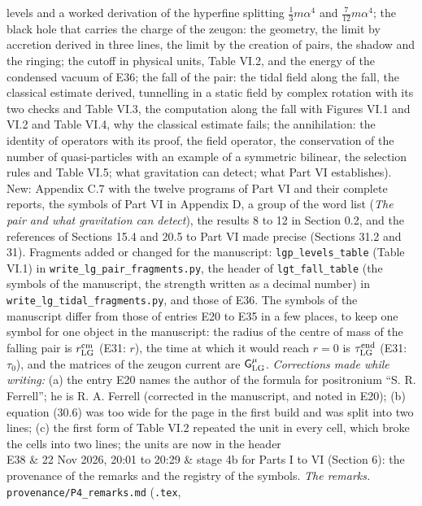 \documentclass[
  10pt,
]{article}
\begin{document}
\begin{longtable}[]
levels and a worked derivation of the hyperfine splitting
\(\tfrac13m\alpha^4\) and \(\tfrac7{12}m\alpha^4\); the black hole that
carries the charge of the zeugon: the geometry, the limit by accretion
derived in three lines, the limit by the creation of pairs, the shadow
and the ringing; the cutoff in physical units, Table VI.2, and the
energy of the condensed vacuum of E36; the fall of the pair: the tidal
field along the fall, the classical estimate derived, tunnelling in a
static field by complex rotation with its two checks and Table VI.3, the
computation along the fall with Figures VI.1 and VI.2 and Table VI.4,
why the classical estimate fails; the annihilation: the identity of
operators with its proof, the field operator, the conservation of the
number of quasi-particles with an example of a symmetric bilinear, the
selection rules and Table VI.5; what gravitation can detect; what Part
VI establishes). New: Appendix C.7 with the twelve programs of Part VI
and their complete reports, the symbols of Part VI in Appendix D, a
group of the word list (\emph{The pair and what gravitation can
detect}), the results 8 to 12 in Section 0.2, and the references of
Sections 15.4 and 20.5 to Part VI made precise (Sections 31.2 and 31).
Fragments added or changed for the manuscript:
\texttt{lgp\_levels\_table} (Table VI.1) in
\texttt{write\_lg\_pair\_fragments.py}, the header of
\texttt{lgt\_fall\_table} (the symbols of the manuscript, the strength
written as a decimal number) in \texttt{write\_lg\_tidal\_fragments.py},
and those of E36. The symbols of the manuscript differ from those of
entries E20 to E35 in a few places, to keep one symbol for one object in
the manuscript: the radius of the centre of mass of the falling pair is
\(r^{\rm cm}_{\rm LG}\) (E31: \(r\)), the time at which it would reach
\(r=0\) is \(\tau^{\rm end}_{\rm LG}\) (E31: \(\tau_0\)), and the
matrices of the zeugon current are \(\mathsf G^\mu_{\rm LG}\).
\emph{Corrections made while writing:} (a) the entry E20 names the
author of the formula for positronium ``S. R. Ferrell''; he is R. A.
Ferrell (corrected in the manuscript, and noted in E20); (b) equation
(30.6) was too wide for the page in the first build and was split into
two lines; (c) the first form of Table VI.2 repeated the unit in every
cell, which broke the cells into two lines; the units are now in the
header \\
E38 & 22 Nov 2026, 20:01 to 20:29 & stage 4b for Parts I to VI (Section
6): the provenance of the remarks and the registry of the symbols.
\emph{The remarks.} \texttt{provenance/P4\_remarks.md} (\texttt{.tex},

\end{longtable}
\end{document}
